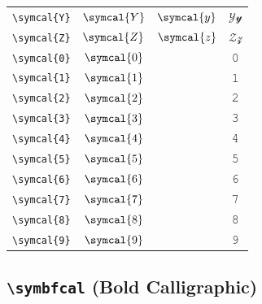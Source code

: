\documentclass[12pt,a4paper]{article}
\begin{document}
\begin{longtable}{|c|c|c|c|}
\verb|\symcal{Y}| & $\symcal{Y}$ & $\symcal{y}$ & $ 𝒴 𝓎 $ \\
\verb|\symcal{Z}| & $\symcal{Z}$ & $\symcal{z}$ & $ 𝒵 𝓏 $ \\
\verb|\symcal{0}| & $\symcal{0}$ & & 𝟶 \\
\verb|\symcal{1}| & $\symcal{1}$ & & 𝟷 \\
\verb|\symcal{2}| & $\symcal{2}$ & & 𝟸 \\
\verb|\symcal{3}| & $\symcal{3}$ & & 𝟹 \\
\verb|\symcal{4}| & $\symcal{4}$ & & 𝟺 \\
\verb|\symcal{5}| & $\symcal{5}$ & & 𝟻 \\
\verb|\symcal{6}| & $\symcal{6}$ & & 𝟼 \\
\verb|\symcal{7}| & $\symcal{7}$ & & 𝟽 \\
\verb|\symcal{8}| & $\symcal{8}$ & & 𝟾 \\
\verb|\symcal{9}| & $\symcal{9}$ & & 𝟿 \\
\hline
\end{longtable}

\newpage

\subsection*{\texttt{\textbackslash{}symbfcal} (Bold Calligraphic)}
\end{document}
